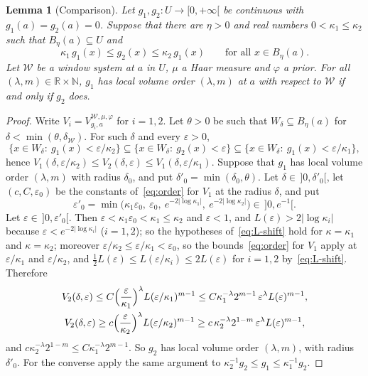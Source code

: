 \documentclass[11pt,a4paper]{article}
\newtheorem{lemma}[theorem]{Lemma}
\theoremstyle{definition}
\theoremstyle{remark}
\numberwithin{equation}{section}
\newcommand{\N}{\mathbb{N}}
\newcommand{\R}{\mathbb{R}}
\newcommand{\abs}[1]{\lvert #1\rvert}
\newcommand{\eps}{\varepsilon}
\begin{document}
\begin{lemma}[Comparison]\label{lem:compare}
Let $g_1,g_2:U\to[0,+\infty[$ be continuous with $g_1(a)=g_2(a)=0$. Suppose that there are $\eta>0$ and real numbers $0<\kappa_1\le\kappa_2$ such that $B_\eta(a)\subseteq U$ and
\[
\kappa_1\,g_1(x)\le g_2(x)\le\kappa_2\,g_1(x)\qquad\text{for all }x\in B_\eta(a).
\]
Let $\mathcal W$ be a window system at $a$ in $U$, $\mu$ a Haar measure and $\varphi$ a prior. For all $(\lambda,m)\in\R\times\N$, $g_1$ has local volume order $(\lambda,m)$ at $a$ with respect to $\mathcal W$ if and only if $g_2$ does.
\end{lemma}
\begin{proof}
Write $V_i=V^{\mathcal W,\mu,\varphi}_{g_i,a}$ for $i=1,2$. Let $\theta>0$ be such that $W_\delta\subseteq B_\eta(a)$ for $\delta<\min(\theta,\delta_{\mathcal W})$. For such $\delta$ and every $\eps>0$,
\[
\{x\in W_\delta:\ g_1(x)<\eps/\kappa_2\}\subseteq\{x\in W_\delta:\ g_2(x)<\eps\}\subseteq\{x\in W_\delta:\ g_1(x)<\eps/\kappa_1\},
\]
hence $V_1(\delta,\eps/\kappa_2)\le V_2(\delta,\eps)\le V_1(\delta,\eps/\kappa_1)$. Suppose that $g_1$ has local volume order $(\lambda,m)$ with radius $\delta_0$, and put $\delta'_0=\min(\delta_0,\theta)$. Let $\delta\in\,]0,\delta'_0[$, let $(c,C,\eps_0)$ be the constants of~\eqref{eq:order} for $V_1$ at the radius $\delta$, and put
\[
\eps'_0=\min\bigl(\kappa_1\eps_0,\ \eps_0,\ e^{-2\abs{\log\kappa_1}},\ e^{-2\abs{\log\kappa_2}}\bigr)\in\,]0,e^{-1}[ .
\]
Let $\eps\in\,]0,\eps'_0[$. Then $\eps<\kappa_1\eps_0<\kappa_1\le\kappa_2$ and $\eps<1$, and $L(\eps)>2\abs{\log\kappa_i}$ because $\eps<e^{-2\abs{\log\kappa_i}}$ ($i=1,2$); so the hypotheses of~\eqref{eq:L-shift} hold for $\kappa=\kappa_1$ and $\kappa=\kappa_2$; moreover $\eps/\kappa_2\le\eps/\kappa_1<\eps_0$, so the bounds~\eqref{eq:order} for $V_1$ apply at $\eps/\kappa_1$ and $\eps/\kappa_2$, and $\frac12L(\eps)\le L(\eps/\kappa_i)\le2L(\eps)$ for $i=1,2$ by~\eqref{eq:L-shift}. Therefore
\begin{gather*}
V_2(\delta,\eps)\le C\Bigl(\frac\eps{\kappa_1}\Bigr)^\lambda L(\eps/\kappa_1)^{m-1}\le C\kappa_1^{-\lambda}2^{m-1}\,\eps^\lambda L(\eps)^{m-1},\\
V_2(\delta,\eps)\ge c\Bigl(\frac\eps{\kappa_2}\Bigr)^\lambda L(\eps/\kappa_2)^{m-1}\ge c\,\kappa_2^{-\lambda}2^{1-m}\,\eps^\lambda L(\eps)^{m-1},
\end{gather*}
and $c\kappa_2^{-\lambda}2^{1-m}\le C\kappa_1^{-\lambda}2^{m-1}$. So $g_2$ has local volume order $(\lambda,m)$, with radius $\delta'_0$. For the converse apply the same argument to $\kappa_2^{-1}g_2\le g_1\le\kappa_1^{-1}g_2$.
\end{proof}
\end{document}
